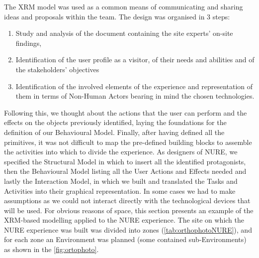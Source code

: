 The XRM model was used as a common means of communicating and sharing ideas and proposals within the team. The design was organised in 3 steps: 
\begin{enumerate}
    \item Study and analysis of the document containing the site experts' on-site findings,
    \item Identification of the user profile as a visitor, of their needs and abilities and of the stakeholders' objectives 
    \item Identification of the involved elements of the experience and representation of them in terms of Non-Human Actors bearing in mind the chosen technologies. 
\end{enumerate}
Following this, we thought about the actions that the user can perform and the effects on the objects previously identified, laying the foundations for the definition of our Behavioural Model. Finally, after having defined all the primitives, it was not difficult to map the pre-defined building blocks to assemble the activities into which to divide the experience. 
As designers of NURE, we specified the Structural Model in which to insert all the identified protagonists, then the Behavioural Model listing all the User Actions and Effects needed and lastly the Interaction Model, in which we built and translated the Tasks and Activities into their graphical representation. In some cases we had to make assumptions as we could not interact directly with the technological devices that will be used. 
For obvious reasons of space, this section presents an example of the XRM-based modelling applied to the NURE experience. The site on which the NURE experience was built was divided into zones (\autoref{tab:orthophotoNURE}), and for each zone an Environment was planned (some contained sub-Environments) as shown in the \autoref{fig:ortophoto}.

